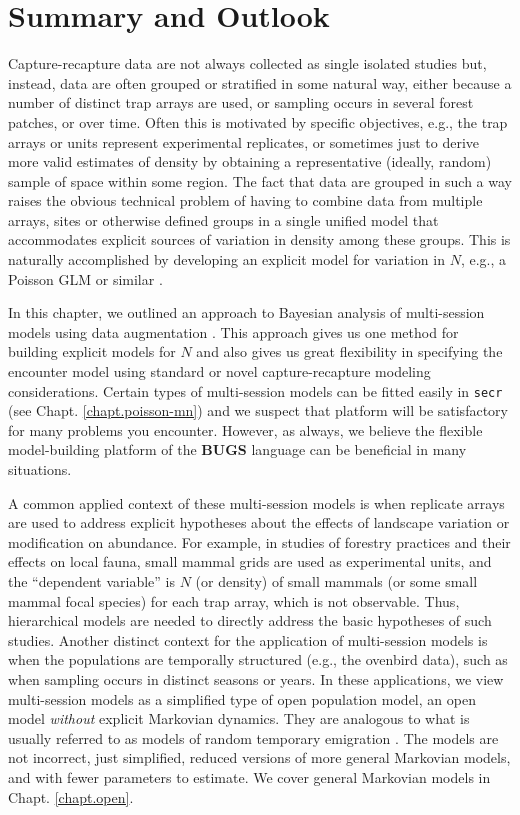 \section{Summary and Outlook}

Capture-recapture data are not always
collected as single isolated
studies but, instead, data are often grouped or stratified in some natural
way, either because a number of distinct trap arrays are used, or
sampling occurs in several forest patches, or over time. Often this is
motivated by specific objectives, e.g., the trap arrays or units
represent experimental replicates, or sometimes just to derive more
valid estimates of density by obtaining a representative (ideally,
random) sample of space within some region.  The fact that data are
grouped in such a way raises the obvious technical problem of having
to combine data from multiple arrays, sites or otherwise defined groups in a single unified
model that accommodates explicit sources of variation in density among
these groups.  This is naturally accomplished by developing an explicit model
for variation in $N$, e.g., a Poisson GLM or similar
\citep{converse_royle:2012, royle_etal:2012arXiv}.

In this chapter, we outlined an approach to Bayesian analysis of
multi-session models using data augmentation
\citet{converse_royle:2012, royle_converse:2013}.  This approach gives
us one method for building explicit models for $N$ and also gives us
great flexibility in specifying the encounter model using standard or
novel capture-recapture modeling considerations. Certain types of
multi-session models can be fitted easily in \mbox{\tt secr} (see
Chapt. \ref{chapt.poisson-mn}) and we suspect that platform will be
satisfactory for many problems you encounter. However, as always, we
believe the flexible model-building platform of the {\bf BUGS}
language can be beneficial in many situations.

A common applied context of these multi-session models is when
replicate arrays are used to address explicit hypotheses about the
effects of landscape variation or modification on abundance. For
example, in studies of forestry practices and their effects on local
fauna, small mammal grids are used as experimental units, and the
``dependent variable'' is $N$ (or density) of small mammals (or some
small mammal focal species) for each trap array, which is not
observable.  Thus, hierarchical models are needed to directly address
the basic hypotheses of such studies.  Another distinct context for
the application of multi-session models is when the populations are
temporally structured (e.g., the ovenbird data), such as when sampling
occurs in distinct seasons or years.  In these applications, we view
multi-session models as a simplified type of open population model, an
open model {\it without} explicit Markovian dynamics. They are
analogous to what is usually referred to as models of random temporary
emigration \citep{kendall_etal:1997, chandler_etal:2011}.  The models
are not incorrect, just simplified, reduced versions of more general
Markovian models, and with fewer parameters to estimate.  We cover
general Markovian models in Chapt. \ref{chapt.open}.

